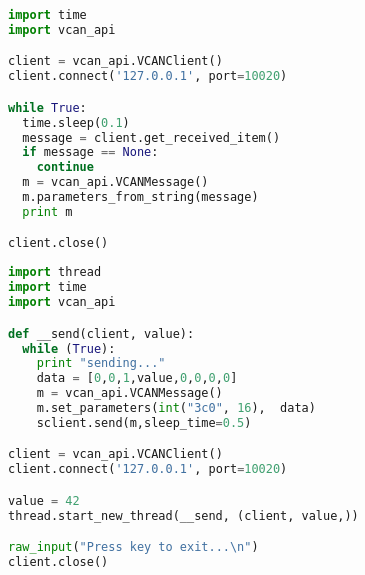 \begin{lstlisting}[frame=single, language=Python, basicstyle=\footnotesize, caption={Empfangsclient via Polling}, label={lst:bsp_client2}]
import time
import vcan_api

client = vcan_api.VCANClient()
client.connect('127.0.0.1', port=10020)

while True:
  time.sleep(0.1)
  message = client.get_received_item()
  if message == None:
    continue
  m = vcan_api.VCANMessage()
  m.parameters_from_string(message)
  print m

client.close()
\end{lstlisting}

\begin{lstlisting}[frame=single, language=Python, basicstyle=\footnotesize, caption={Zyklisch sendender Client via Threads}, label={lst:bsp_client3}]
import thread
import time
import vcan_api

def __send(client, value):
  while (True):
    print "sending..."
    data = [0,0,1,value,0,0,0,0]
    m = vcan_api.VCANMessage()
    m.set_parameters(int("3c0", 16),  data)
    sclient.send(m,sleep_time=0.5)

client = vcan_api.VCANClient()
client.connect('127.0.0.1', port=10020)

value = 42
thread.start_new_thread(__send, (client, value,))

raw_input("Press key to exit...\n")
client.close()
\end{lstlisting}









